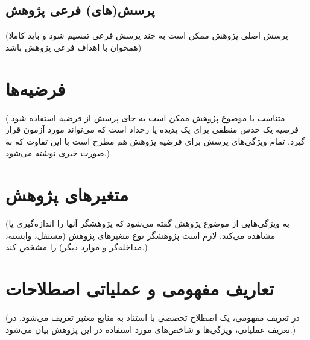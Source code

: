 \subsection{پرسش‌(های) فرعی پژوهش}
(پرسش اصلی پژوهش ممکن است به چند پرسش فرعی تقسیم شود و باید کاملا همخوان با اهداف فرعی پژوهش باشد)
\section{فرضیه‌ها}
(متناسب با موضوع پژوهش ممکن است به جای پرسش از فرضیه استفاده شود.  فرضیه یک حدس منطقی برای یک پدیده یا رخداد است که می‌تواند مورد آزمون قرار گیرد. تمام ویژگی‌های پرسش برای فرضیه پژوهش هم مطرح است با این تفاوت که به صورت خبری نوشته می‌شود.)
\section{متغیرهای پژوهش}
(به ویژگی‌هایی از موضوع پژوهش گفته می‌شود که پژوهشگر آنها را  اندازه‌گیری یا مشاهده می‌کند. لازم است پژوهشگر نوع متغیرهای پژوهش (مستقل، وابسته، مداخله‌گر و موارد دیگر) را مشخص کند.)
\section{تعاریف مفهومی و عملیاتی اصطلاحات}
(در تعریف مفهومی، یک اصطلاح تخصصی با استناد به منابع معتبر تعریف می‌شود. در تعریف عملیاتی، ویژگی‌ها و شاخص‌های مورد استفاده در این پژوهش بیان می‌شود.)